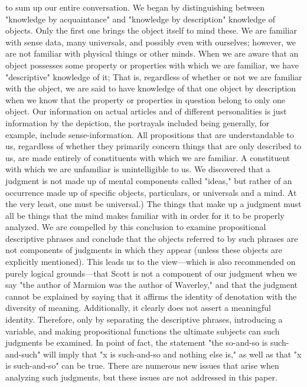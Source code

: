 \documentclass[a4paper,12pt]{book}[2004/02/16]
\theoremstyle{ilemma}
\theoremstyle{itheorem}
\theoremstyle{iother}
\theoremstyle{icorollary}
\theoremstyle{numcorollary}
\theoremstyle{idefinition}
\begin{document}
to sum up our entire conversation. We began by distinguishing between "knowledge by acquaintance" and "knowledge by description" knowledge of objects. Only the first one brings the object itself to mind these. We are familiar with sense data, many universals, and possibly even with ourselves; however, we are not familiar with physical things or other minds. When we are aware that an object possesses some property or properties with which we are familiar, we have "descriptive" knowledge of it; That is, regardless of whether or not we are familiar with the object, we are said to have knowledge of that one object by description when we know that the property or properties in question belong to only one object. Our
information on actual articles and of different personalities is just information by
the depiction, the portrayals included being generally, for example, include
sense-information. All propositions that are understandable to us, regardless of whether they primarily concern things that are only described to us, are made entirely of constituents with which we are familiar. A constituent with which we are unfamiliar is unintelligible to us. We discovered that a judgment is not made up of mental components called "ideas," but rather of an occurrence made up of specific objects, particulars, or universals and a mind. At the very least, one must be universal.) The things that make up a judgment must all be things that the mind makes familiar with in order for it to be properly analyzed. We are compelled by this conclusion to examine propositional descriptive phrases and conclude that the objects referred to by such phrases are not components of judgments in which they appear (unless these objects are explicitly mentioned). This leads us to the view—which is also recommended on purely logical grounds—that Scott is not a component of our judgment when we say "the author of Marmion was the author of Waverley," and that the judgment cannot be explained by saying that it affirms the identity of denotation with the diversity of meaning. Additionally, it clearly does not assert a meaningful identity. Therefore, only by separating the descriptive phrases, introducing a variable, and making propositional functions the ultimate subjects can such judgments be examined. In point of fact, the statement "the so-and-so is such-and-such" will imply that "x is such-and-so and nothing else is," as well as that "x is such-and-so" can be true. There are numerous new issues that arise when analyzing such judgments, but these issues are not addressed in this paper.
\backmatter
\end{document}
